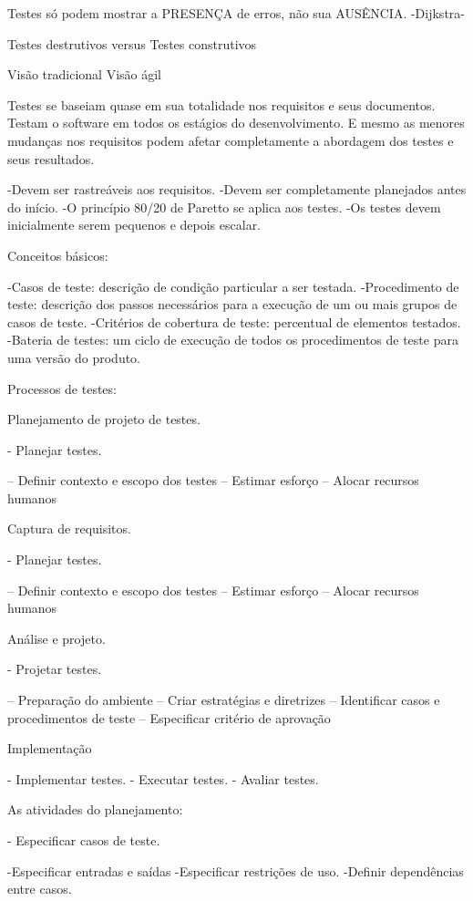 \documentclass{article}
\begin{document}
			Testes só podem mostrar a PRESENÇA de erros, não sua AUSÊNCIA. -Dijkstra-

		Testes destrutivos versus Testes construtivos

			Visão tradicional
			Visão ágil

		Testes se baseiam quase em sua totalidade nos requisitos e seus documentos. Testam o software em todos os estágios do desenvolvimento. E mesmo as menores mudanças nos requisitos podem afetar completamente a abordagem dos testes e seus resultados.

			-Devem ser rastreáveis aos requisitos.
			-Devem ser completamente planejados antes do início.
			-O princípio 80/20 de Paretto se aplica aos testes.
			-Os testes devem inicialmente serem pequenos e depois escalar.

	Conceitos básicos:

		-Casos de teste: descrição de condição particular a ser testada.
		-Procedimento de teste: descrição dos passos necessários para a execução de um ou mais grupos de casos de teste.
		-Critérios de cobertura de teste: percentual de elementos testados.
		-Bateria de testes: um ciclo de execução de todos os procedimentos de teste para uma versão do produto.

	Processos de testes:

		Planejamento de projeto de testes.

			- Planejar testes.

				– Definir contexto e escopo dos testes
				– Estimar esforço
				– Alocar recursos humanos

		Captura de requisitos.

			- Planejar testes.

				– Definir contexto e escopo dos testes
				– Estimar esforço
				– Alocar recursos humanos

		Análise e projeto.

			- Projetar testes.

				– Preparação do ambiente
				– Criar estratégias e diretrizes
				– Identificar casos e procedimentos de teste
				– Especificar critério de aprovação

		Implementação

			- Implementar testes.
			- Executar testes.
			- Avaliar testes.

		As atividades do planejamento:

			- Especificar casos de teste.

				-Especificar entradas e saídas
				-Especificar restrições de uso.
				-Definir dependências entre casos.
\end{document}
